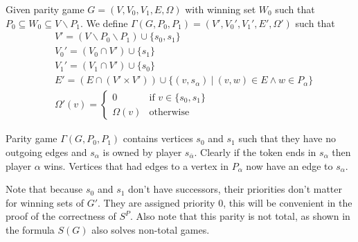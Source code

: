 \begin{definition}
	\label{def_gamma_games}
	Given parity game $G=(V,V_0,V_1,E,\Omega)$ with winning set $W_0$ such that $P_0 \subseteq W_0 \subseteq V \backslash P_1$. We define $\Gamma(G,P_0,P_1) = (V',V_0',V_1',E',\Omega')$ such that
	\begin{align*}
	&V' = (V \backslash P_0 \backslash P_1) \cup \{s_0,s_1\}\\
	&V_0' = (V_0 \cap V') \cup \{s_1\}\\
	&V_1' = (V_1 \cap V') \cup \{s_0\}\\
	&E' = (E \cap (V' \times V')) \cup \{ (v,s_\alpha)\ |\ (v,w) \in E \wedge w \in P_\alpha \}\\
	&\Omega'(v) = \begin{cases}0 & \text{if } v\in \{s_0,s_1\}\\
	\Omega(v) & \text{otherwise}\end{cases}
	\end{align*}
\end{definition}
Parity game $\Gamma(G,P_0,P_1)$ contains vertices $s_0$ and $s_1$ such that they have no outgoing edges and $s_\alpha$ is owned by player $s_{\overline{\alpha}}$. Clearly if the token ends in $s_\alpha$ then player $\alpha$ wins. Vertices that had edges to a vertex in $P_\alpha$ now have an edge to $s_\alpha$. 

Note that because $s_0$ and $s_1$ don't have successors, their priorities don't matter for winning sets of $G'$. They are assigned priority 0, this will be convenient in the proof of the correctness of $S^P$. Also note that this parity is not total, as shown in \cite{WALUKIEWICZ2002311} the formula $S(G)$ also solves non-total games.

